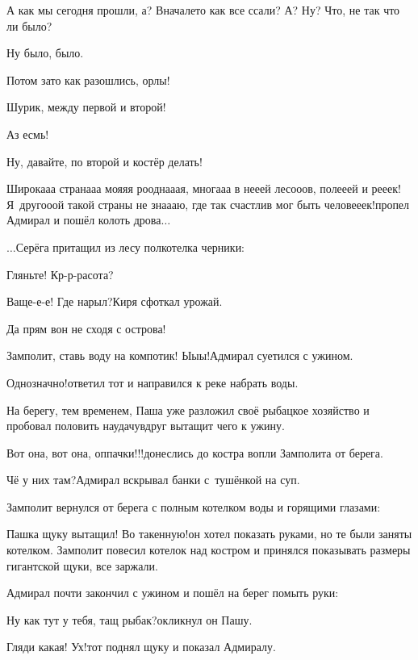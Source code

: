 \diagdash А как мы сегодня прошли, а? Вначале\sdash то как все ссали? А? Ну? Что, не так что ли было?

\diagdash Ну было, было.

\diagdash Потом зато как разошлись, орлы!

\diagdash Шурик, между первой и второй!

\diagdash Аз есмь!

\diagdash Ну, давайте, по второй и костёр делать!

\diagdash Широка\sdash а\sdash а страна\sdash а\sdash а моя\sdash я\sdash я роодна\sdash а\sdash ая, многа\sdash а\sdash а в не\sdash е\sdash ей лесо\sdash о\sdash ов, поле\sdash е\sdash ей и ре\sdash е\sdash ек! Я~друго\sdash о\sdash ой такой страны не зна\sdash а\sdash аю, где так счастлив мог быть челове\sdash е\sdash ек!\mdash пропел Адмирал и пошёл колоть дрова$\ldots$
 
$\ldots$Серёга притащил из лесу полкотелка черники:

\diagdash Гляньте! Кр-р-расота?

\diagdash Ваще-е-е! Где нарыл?\mdash Киря сфоткал урожай.

\diagdash Да прям вон не сходя с острова!

\diagdash Замполит, ставь воду на компотик! Ы\sdash ы\sdash ы!\mdash Адмирал суетился с ужином.

\diagdash Однозначно!\mdash ответил тот и направился к реке набрать воды.

На берегу, тем временем, Паша уже разложил своё рыбацкое хозяйство и пробовал половить наудачу\mdash вдруг вытащит чего к ужину. 

\diagdash Вот она, вот она, оп\sdash пачки!!!\mdash донеслись до костра вопли Замполита от берега.

\diagdash Чё у них там?\mdash Адмирал вскрывал банки с~тушёнкой на суп.

Замполит вернулся от берега с полным котелком воды и горящими глазами:

\diagdash Пашка щуку вытащил! Во такенную!\mdash он хотел показать руками, но те были заняты котелком. Замполит повесил котелок над костром и принялся показывать размеры гигантской щуки, все заржали.

Адмирал почти закончил с ужином и пошёл на берег помыть руки:

\diagdash Ну как тут у тебя, тащ рыбак?\mdash окликнул он Пашу.

\diagdash Гляди какая! Ух!\mdash тот поднял щуку и показал Адмиралу.

